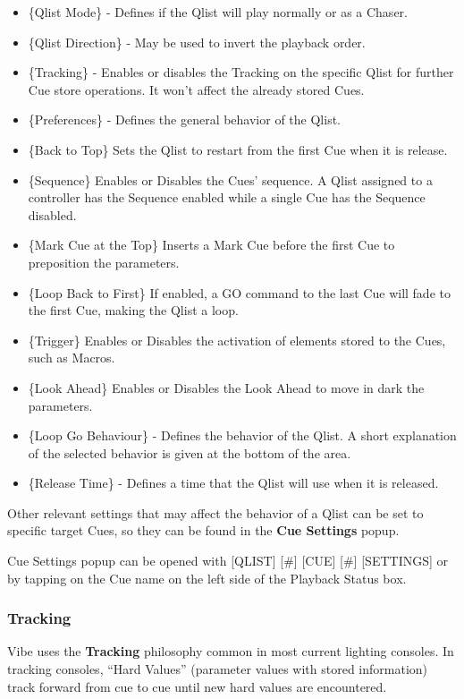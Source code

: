 \documentclass[
]{article}
\begin{document}
\begin{itemize}
\item
  \{Qlist Mode\} - Defines if the Qlist will play normally or as a Chaser.
\item
  \{Qlist Direction\} - May be used to invert the playback order.
\item
  \{Tracking\} - Enables or disables the Tracking on the specific Qlist for further Cue store operations. It won't affect the already stored Cues.
\item
  \{Preferences\} - Defines the general behavior of the Qlist.
\item
  \{Back to Top\} Sets the Qlist to restart from the first Cue when it is release.
\item
  \{Sequence\} Enables or Disables the Cues' sequence. A Qlist assigned to a controller has the Sequence enabled while a single Cue has the Sequence disabled.
\item
  \{Mark Cue at the Top\} Inserts a Mark Cue before the first Cue to preposition the parameters.
\item
  \{Loop Back to First\} If enabled, a GO command to the last Cue will fade to the first Cue, making the Qlist a loop.
\item
  \{Trigger\} Enables or Disables the activation of elements stored to the Cues, such as Macros.
\item
  \{Look Ahead\} Enables or Disables the Look Ahead to move in dark the parameters.
\item
  \{Loop Go Behaviour\} - Defines the behavior of the Qlist. A short explanation of the selected behavior is given at the bottom of the area.
\item
  \{Release Time\} - Defines a time that the Qlist will use when it is released.
\end{itemize}

Other relevant settings that may affect the behavior of a Qlist can be set to specific target Cues, so they can be found in the \textbf{Cue Settings} popup.

Cue Settings popup can be opened with {[}QLIST{]} {[}\#{]} {[}CUE{]} {[}\#{]} {[}SETTINGS{]} or by tapping on the Cue name on the left side of the Playback Status box.

\hypertarget{tracking}{%
\subsubsection{Tracking}\label{tracking}}

Vibe uses the \textbf{Tracking} philosophy common in most current lighting consoles. In tracking consoles, ``Hard Values'' (parameter values with stored information) track forward from cue to cue until new hard values are encountered.
\end{document}
